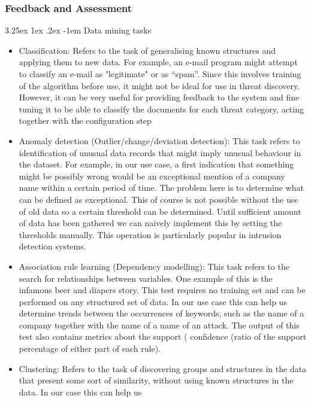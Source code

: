 \documentclass[12pt]{article}
\makeatletter
\newcounter{subsubsubsection}[subsubsection]
\renewcommand\paragraph{\@startsection{paragraph}{5}{\z@}%
  {3.25ex \@plus1ex \@minus.2ex}%
  {-1em}%
  {\normalfont\normalsize\bfseries}}
\makeatother
\begin{document}
\subsubsection{Feedback and Assessment}
\paragraph{Data mining tasks}
\begin{itemize}
\item 
Classification: Refers to the task of generalising known structures and applying them to new
data. For example, an e-mail program might attempt to classify an e-mail as "legitimate" or as
“spam”. Since this involves training of the algorithm before use, it might not be ideal for use in
threat discovery. However, it can be very useful for providing feedback to the system and fine
tuning it to be able to classify the documents for each threat category, acting together with the
configuration step
\item 
Anomaly detection (Outlier/change/deviation detection): This task refers to identification of
unusual data records that might imply unusual behaviour in the dataset. For example, in our
use case, a first indication that something might be possibly wrong would be an exceptional
mention of a company name within a certain period of time. The problem here is to determine
what can be defined as exceptional. This of course is not possible without the use of old data
so a certain threshold can be determined. Until sufficient amount of data has been gathered we
can naively implement this by setting the thresholds manually. This operation is particularly
popular in intrusion detection systems.
\item 
Association rule learning (Dependency modelling): This task refers to the search for
relationships between variables. One example of this is the infamous beer and diapers story.
This test requires no training set and can be performed on any structured set of data. In our
use case this can help us determine trends between the occurrences of keywords, such as the
name of a company together with the name of a name of an attack. The output of this test also
contains metrics about the support (%
confidence (ratio of the support percentage of either part of each rule).
\item 
Clustering: Refers to the task of discovering groups and structures in the data that present
some sort of similarity, without using known structures in the data. In our case this can help us

\end{itemize}
\end{document}
